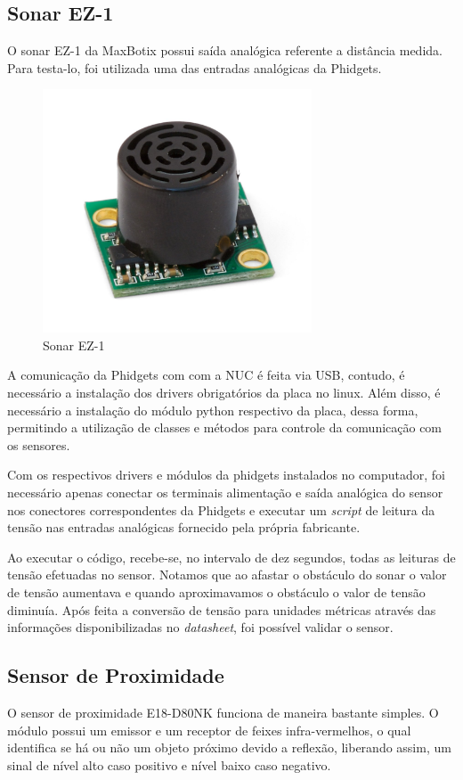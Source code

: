 	\subsection{Sonar EZ-1}
		O sonar EZ-1 da MaxBotix possui saída analógica referente a distância medida. Para testa-lo, foi utilizada uma das entradas analógicas da Phidgets.
		
		\pagebreak
		
		\begin{figure}[!ht]
		   \centering
		   \includegraphics[width=8cm]{Figures/ez1.jpg}
		   \caption{Sonar EZ-1}
		   \label{fig:ez1}
		\end{figure}
		
		A comunicação da Phidgets com com a NUC é feita via USB, contudo, é necessário a instalação dos drivers obrigatórios da placa no linux. Além disso, é necessário a instalação do módulo python respectivo da placa, dessa forma, permitindo a utilização de classes e métodos para controle da comunicação com os sensores.
		
		Com os respectivos drivers e módulos da phidgets instalados no computador, foi necessário apenas conectar os terminais alimentação e saída analógica do sensor nos conectores correspondentes da Phidgets e executar um \textit{script} de leitura da tensão nas entradas analógicas fornecido pela própria fabricante. 
		
		Ao executar o código, recebe-se, no intervalo de dez segundos, todas as leituras de tensão efetuadas no sensor. Notamos que ao afastar o obstáculo do sonar o valor de tensão aumentava e quando aproximavamos o obstáculo o valor de tensão diminuía. Após feita a conversão de tensão para unidades métricas através das informações disponibilizadas no \textit{datasheet}, foi possível validar o sensor.
	
	\subsection{Sensor de Proximidade}
		O sensor de proximidade E18-D80NK funciona de maneira bastante simples. O módulo possui um emissor e um receptor de feixes infra-vermelhos, o qual identifica se há ou não um objeto próximo devido a reflexão, liberando assim, um sinal de nível alto caso positivo e nível baixo caso negativo.
		
